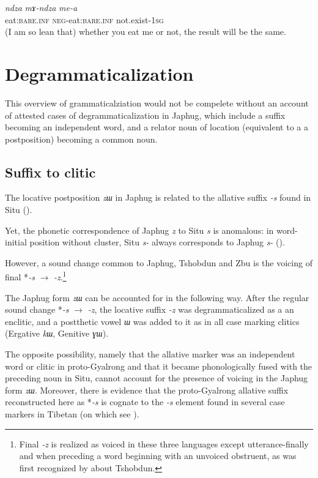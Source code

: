 \documentclass[oneside,a4paper,11pt]{article}
\newcommand{\ipa}[1]{\mbox{\phon\textit{#1}}} %
\newcommand{\change}[2]{*\ipa{#1} $\rightarrow$ \ipa{#2}}
\begin{document}
\begin{exe}
\ex \label{ex:mAndza}
\gll \ipa{ndza} \ipa{mɤ-ndza} \ipa{me-a} \\
eat:\textsc{bare.inf} \textsc{neg}-eat:\textsc{bare.inf} not.exist-\textsc{1sg} \\
\glt (I am so lean that) whether you eat me or not, the result will be the same.
\end{exe}
 
 \section{Degrammaticalization}
 This overview of grammaticalziation would not be compelete without an account of attested cases of degrammaticalization in Japhug, which include a suffix  becoming an independent word, and a relator noun of location (equivalent to a a postposition) becoming a common noun.
 
 
 \subsection{Suffix to clitic}
The locative postposition  \ipa{zɯ} in Japhug is related to the allative suffix \ipa{-s} found in Situ (\citealt[330]{linxr93jiarong}).  

Yet, the phonetic correspondence of Japhug \ipa{z} to Situ \ipa{s} is anomalous: in word-initial position without cluster, Situ \ipa{s-} always corresponds to Japhug \ipa{s-}  (\citealt[317-8]{jacques04these}).

However, a sound change common to Japhug, Tshobdun and Zbu is the voicing of final \change{-s}{-z}.\footnote{Final \ipa{-z} is realized as voiced in these three languages except utterance-finally and when preceding a word beginning with an unvoiced obstruent, as was first recognized by  \citet{jackson05yingao} about Tshobdun.} 

The Japhug form \ipa{zɯ} can be accounted for in the following way. After the regular sound change \change{-s}{-z}, the locative suffix \ipa{-z} was degrammaticalized as a an enclitic, and a postthetic vowel \ipa{ɯ} was added to it as in all case marking clitics (Ergative \ipa{kɯ}, Genitive \ipa{ɣɯ}). 

 The opposite possibility, namely that the allative marker was an independent word or clitic in proto-Gyalrong and that it became phonologically fused with the preceding noun in Situ, cannot account for the presence of voicing in the Japhug form \ipa{zɯ}. Moreover, there is evidence that the proto-Gyalrong allative suffix reconstructed here as *\ipa{-s} is cognate to the \ipa{-s} element found in several case markers in Tibetan (on which see \citealt{hill12bas}).
  
\end{document}
